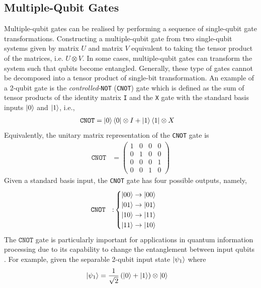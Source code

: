 \subsection{Multiple-Qubit Gates\label{subsec:multiple-q-gates}}
Multiple-qubit gates can be realised by performing a sequence of single-qubit gate transformations. Constructing a multiple-qubit gate from two single-qubit systems given by matrix $U$ and matrix $V$ equivalent to taking the tensor product of the matrices, i.e. $U\otimes V$. In some cases, multiple-qubit gates can transform the system such that qubits become entangled. Generally, these type of gates cannot be decomposed into a tensor product of single-bit transformation. An example of a 2-qubit gate is the \textit{controlled}-\texttt{NOT} (\texttt{CNOT}) gate which is defined as the sum of tensor products of the identity matrix \texttt{I} and the \texttt{X} gate with the standard basis inputs $\ket{0}$ and $\ket{1}$, i.e.,
\begin{align}\label{eqn:cnotdef}
	\texttt{CNOT}	&= \ket{0}\bra{0}\otimes I + \ket{1}\bra{1}\otimes X
\end{align}
Equivalently, the unitary matrix representation of the \texttt{CNOT} gate is
\begin{align}\label{eqn:cnotmatrix}
	\texttt{CNOT}	& = \left(\begin{matrix}
		1 & 0  & 0 & 0\\
		0 & 1  & 0 & 0\\
		0 & 0  & 0 & 1 \\
		0 & 0  & 1 & 0
	\end{matrix}\right)
\end{align}
Given a standard basis input, the \texttt{CNOT} gate has four possible outputs, namely,
\begin{align}
	\texttt{CNOT}~~: & \begin{cases}
		\ket{00} \rightarrow \ket{00}\\
		\ket{01} \rightarrow \ket{01}\\
		\ket{10} \rightarrow \ket{11}\\
		\ket{11} \rightarrow \ket{10}	
	\end{cases}
\end{align}
The $\texttt{CNOT}$ gate is particularly important for applications in quantum information processing due to its capability to change the entanglement between input qubits \cite{Rieffel2011}. For example, given the separable 2-qubit input state $\ket{\psi_1}$ where  
\begin{align}
	\ket{\psi_1}	& = \frac{1}{\sqrt{2}}\left(\ket{0} + \ket{1}\right)\otimes\ket{0}
\end{align}

